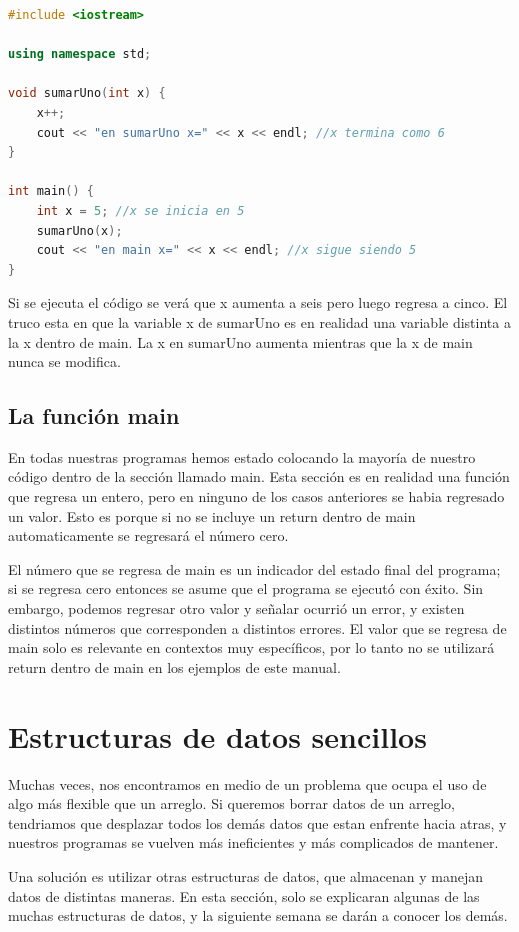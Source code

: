 \documentclass{article}
\begin{document}
\begin{lstlisting}[language=C++, title=Parámetros]
#include <iostream>

using namespace std;

void sumarUno(int x) {
	x++;
	cout << "en sumarUno x=" << x << endl; //x termina como 6
}

int main() {
	int x = 5; //x se inicia en 5
	sumarUno(x);
	cout << "en main x=" << x << endl; //x sigue siendo 5
}
\end{lstlisting}

Si se ejecuta el código se verá que x aumenta a seis pero luego regresa a cinco. El truco esta en que la variable x de sumarUno es en realidad una variable distinta a la x dentro de main. La x en sumarUno aumenta mientras que la x de main nunca se modifica.

\subsection{La función main}

En todas nuestras programas hemos estado colocando la mayoría de nuestro código dentro de la sección llamado main. Esta sección es en realidad una función que regresa un entero, pero en ninguno de los casos anteriores se habia regresado un valor. Esto es porque si no se incluye un return dentro de main automaticamente se regresará el número cero.

El número que se regresa de main es un indicador del estado final del programa; si se regresa cero entonces se asume que el programa se ejecutó con éxito. Sin embargo, podemos regresar otro valor y señalar ocurrió un error, y existen distintos números que corresponden a distintos errores. El valor que se regresa de main solo es relevante en contextos muy específicos, por lo tanto no se utilizará return dentro de main en los ejemplos de este manual.

\section{Estructuras de datos sencillos}

Muchas veces, nos encontramos en medio de un problema que ocupa el uso de algo más flexible que un arreglo. Si queremos borrar datos de un arreglo, tendriamos que desplazar todos los demás datos que estan enfrente hacia atras, y nuestros programas se vuelven más ineficientes y más complicados de mantener.

Una solución es utilizar otras estructuras de datos, que almacenan y manejan datos de distintas maneras. En esta sección, solo se explicaran algunas de las muchas estructuras de datos, y la siguiente semana se darán a conocer los demás.
\end{document}
